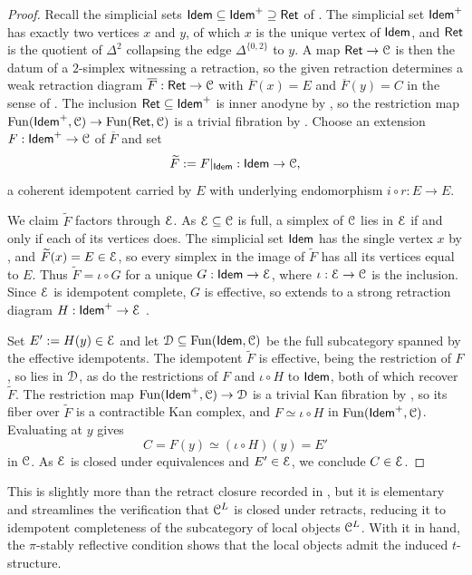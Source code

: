 \begin{proof}
    Recall the simplicial sets $\mathsf{Idem}\subseteq\mathsf{Idem}^{+}\supseteq\mathsf{Ret}$ of \cite[Def. 4.4.5.2]{HTT}. The simplicial set $\mathsf{Idem}^{+}$ has exactly two vertices $x$ and $y$, of which $x$ is the unique vertex of $\mathsf{Idem}$, and $\mathsf{Ret}$ is the quotient of $\Delta^{2}$ collapsing the edge $\Delta^{\{0,2\}}$ to $y$. A map $\mathsf{Ret}\to\EuScript{C}$ is then the datum of a $2$-simplex witnessing a retraction, so the given retraction determines a weak retraction diagram $\overline{F}:\mathsf{Ret}\to\EuScript{C}$ with $\overline{F}(x)=E$ and $\overline{F}(y)=C$ in the sense of \cite[Def. 4.4.5.4]{HTT}. The inclusion $\mathsf{Ret}\subseteq\mathsf{Idem}^{+}$ is inner anodyne by \cite[Prop. 4.4.5.6]{HTT}, so the restriction map $\mathrm{Fun}(\mathsf{Idem}^{+},\EuScript{C})\to\mathrm{Fun}(\mathsf{Ret},\EuScript{C})$ is a trivial fibration by \cite[Cor. 4.4.5.7]{HTT}. Choose an extension $F:\mathsf{Idem}^{+}\to\EuScript{C}$ of $\overline{F}$ and set
    $$\widetilde{F}:=F|_{\mathsf{Idem}}:\mathsf{Idem}\to\EuScript{C},$$
    a coherent idempotent carried by $E$ with underlying endomorphism $i\circ r:E\to E$. 

    We claim $\widetilde{F}$ factors through $\EuScript{E}$. As $\EuScript{E}\subseteq\EuScript{C}$ is full, a simplex of $\EuScript{C}$ lies in $\EuScript{E}$ if and only if each of its vertices does. The simplicial set $\mathsf{Idem}$ has the single vertex $x$ by \cite[Rem. 4.4.5.3]{HTT}, and $\widetilde{F}(x)=E\in\EuScript{E}$, so every simplex in the image of $\widetilde{F}$ has all its vertices equal to $E$. Thus $\widetilde{F}=\iota\circ G$ for a unique $G:\mathsf{Idem}\to\EuScript{E}$, where $\iota:\EuScript{E}\to\EuScript{C}$ is the inclusion. Since $\EuScript{E}$ is idempotent complete, $G$ is effective, so extends to a strong retraction diagram $H:\mathsf{Idem}^{+}\to\EuScript{E}$ \cite[Cor. 4.4.5.14 \& 4.4.5.15]{HTT}. 

    Set $E':=H(y)\in\EuScript{E}$ and let $\EuScript{D}\subseteq\mathrm{Fun}(\mathsf{Idem},\EuScript{C})$ be the full subcategory spanned by the effective idempotents. The idempotent $\widetilde{F}$ is effective, being the restriction of $F$, so lies in $\EuScript{D}$, as do the restrictions of $F$ and $\iota\circ H$ to $\mathsf{Idem}$, both of which recover $\widetilde{F}$. The restriction map $\mathrm{Fun}(\mathsf{Idem}^{+},\EuScript{C})\to\EuScript{D}$ is a trivial Kan fibration by \cite[Cor. 4.4.5.16]{HTT}, so its fiber over $\widetilde{F}$ is a contractible Kan complex, and $F\simeq\iota\circ H$ in $\mathrm{Fun}(\mathsf{Idem}^{+},\EuScript{C})$. Evaluating at $y$ gives
    $$C=F(y)\simeq(\iota\circ H)(y)=E'$$
    in $\EuScript{C}$. As $\EuScript{E}$ is closed under equivalences and $E'\in\EuScript{E}$, we conclude $C\in\EuScript{E}$. 
\end{proof}
This is slightly more than the retract closure recorded in \cite[\S 4.4.5]{HTT}, but it is elementary and streamlines the verification that $\EuScript{C}^{L}$ is closed under retracts, reducing it to idempotent completeness of the subcategory of local objects $\EuScript{C}^{L}$. With it in hand, the $\pi$-stably reflective condition shows that the local objects admit the induced $t$-structure.
